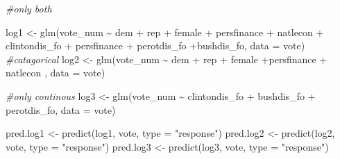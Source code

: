 \documentclass[
]{article}
\newenvironment{Shaded}{\begin{snugshade}}{\end{snugshade}}
\newcommand{\AttributeTok}[1]{\textcolor[rgb]{0.77,0.63,0.00}{#1}}
\newcommand{\CommentTok}[1]{\textcolor[rgb]{0.56,0.35,0.01}{\textit{#1}}}
\newcommand{\FunctionTok}[1]{\textcolor[rgb]{0.00,0.00,0.00}{#1}}
\newcommand{\NormalTok}[1]{#1}
\newcommand{\OtherTok}[1]{\textcolor[rgb]{0.56,0.35,0.01}{#1}}
\newcommand{\SpecialCharTok}[1]{\textcolor[rgb]{0.00,0.00,0.00}{#1}}
\newcommand{\StringTok}[1]{\textcolor[rgb]{0.31,0.60,0.02}{#1}}
\begin{document}
\begin{Shaded}
\begin{Highlighting}[]
\CommentTok{\#only both }

\NormalTok{log1 }\OtherTok{\textless{}{-}} \FunctionTok{glm}\NormalTok{(vote\_num }\SpecialCharTok{\textasciitilde{}}\NormalTok{  dem }\SpecialCharTok{+}\NormalTok{ rep }\SpecialCharTok{+}\NormalTok{ female }\SpecialCharTok{+}\NormalTok{ persfinance }\SpecialCharTok{+} 
\NormalTok{              natlecon }\SpecialCharTok{+}\NormalTok{ clintondis\_fo }\SpecialCharTok{+}\NormalTok{ persfinance }\SpecialCharTok{+}\NormalTok{ perotdis\_fo }\SpecialCharTok{+}\NormalTok{bushdis\_fo,}
           \AttributeTok{data =}\NormalTok{ vote)}
\CommentTok{\#catagorical}
\NormalTok{log2 }\OtherTok{\textless{}{-}} \FunctionTok{glm}\NormalTok{(vote\_num }\SpecialCharTok{\textasciitilde{}}\NormalTok{ dem }\SpecialCharTok{+}\NormalTok{ rep }\SpecialCharTok{+}\NormalTok{ female }\SpecialCharTok{+}\NormalTok{persfinance }\SpecialCharTok{+}
\NormalTok{          natlecon ,}
           \AttributeTok{data =}\NormalTok{ vote)}

\CommentTok{\#only continous}
\NormalTok{log3 }\OtherTok{\textless{}{-}} \FunctionTok{glm}\NormalTok{(vote\_num }\SpecialCharTok{\textasciitilde{}}\NormalTok{ clintondis\_fo }\SpecialCharTok{+}\NormalTok{ bushdis\_fo }\SpecialCharTok{+}
\NormalTok{              perotdis\_fo,}
           \AttributeTok{data =}\NormalTok{ vote)}


\NormalTok{pred.log1 }\OtherTok{\textless{}{-}} \FunctionTok{predict}\NormalTok{(log1, vote, }\AttributeTok{type =} \StringTok{"response"}\NormalTok{)}
\NormalTok{pred.log2 }\OtherTok{\textless{}{-}} \FunctionTok{predict}\NormalTok{(log2, vote, }\AttributeTok{type =} \StringTok{"response"}\NormalTok{)}
\NormalTok{pred.log3 }\OtherTok{\textless{}{-}} \FunctionTok{predict}\NormalTok{(log3, vote, }\AttributeTok{type =} \StringTok{"response"}\NormalTok{)}
\end{Highlighting}
\end{Shaded}
\end{document}
